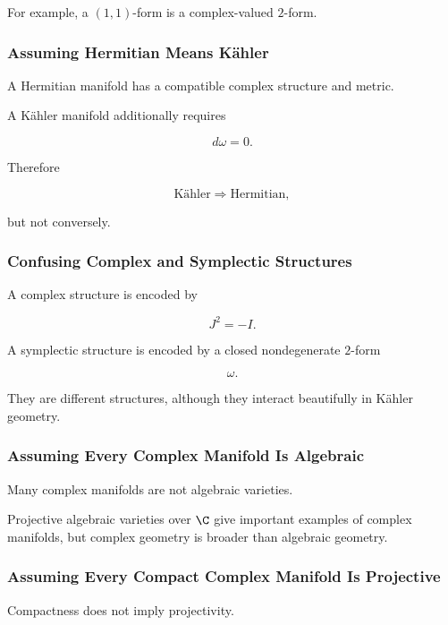 For example, a \((1,1)\)-form is a complex-valued \(2\)-form.

\subsubsection{Assuming Hermitian Means K\"ahler}

A Hermitian manifold has a compatible complex structure and metric.

A K\"ahler manifold additionally requires

\[
\boxed{d\omega=0.}
\]

Therefore

\[
\boxed{
\text{K\"ahler}
\Longrightarrow
\text{Hermitian},
}
\]

but not conversely.

\subsubsection{Confusing Complex and Symplectic Structures}

A complex structure is encoded by

\[
J^2=-I.
\]

A symplectic structure is encoded by a closed nondegenerate \(2\)-form

\[
\omega.
\]

They are different structures, although they interact beautifully in
K\"ahler geometry.

\subsubsection{Assuming Every Complex Manifold Is Algebraic}

Many complex manifolds are not algebraic varieties.

Projective algebraic varieties over \(\C\) give important examples of complex
manifolds, but complex geometry is broader than algebraic geometry.

\subsubsection{Assuming Every Compact Complex Manifold Is Projective}

Compactness does not imply projectivity.

